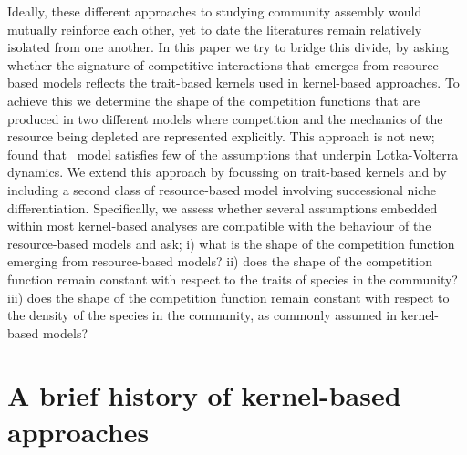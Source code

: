 \documentclass[a4paper,11pt]{article}
\begin{document}
Ideally, these different approaches to studying community assembly
would mutually reinforce each other, yet to date the literatures
remain relatively isolated from one another.
%
In this paper we try to bridge this divide, by asking whether the
signature of competitive interactions that emerges from resource-based
models reflects the trait-based kernels used in kernel-based
approaches.
%
To achieve this we determine the shape of the competition functions
that are produced in two different models where competition and the
mechanics of the resource being depleted are represented explicitly.
%
This approach is not new; \citet{Abrams-2008} found that \Rstar\ model
satisfies few of the assumptions that underpin Lotka-Volterra
dynamics.
%
We extend this approach by focussing on trait-based kernels and by
including a second class of resource-based model involving
successional niche differentiation.
%
Specifically, we assess whether several assumptions embedded within
most kernel-based analyses are compatible with the behaviour of the
resource-based models and ask;
%
i) what is the shape of the competition function emerging from resource-based
models?
%
ii) does the shape of the competition function remain constant with
respect to the traits of species in the community?
%
iii) does the shape of the competition function remain constant with
respect to the density of the species in the community, as commonly
assumed in kernel-based models?

\section{A brief history of kernel-based approaches}


\end{document}
